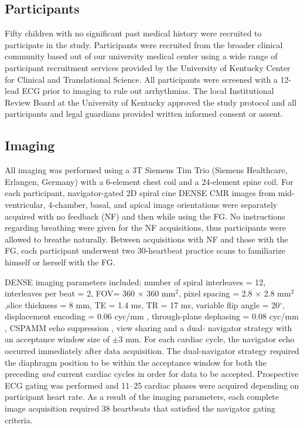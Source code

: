 \subsection{Participants}
	Fifty children with no significant past medical history were recruited to participate in the study. Participants were recruited from the broader clinical community based out of our university medical center using a wide range of participant recruitment services provided by the University of Kentucky Center for Clinical and Translational Science. All participants were screened with a 12-lead ECG prior to imaging to rule out arrhythmias. The local Institutional Review Board at the University of Kentucky approved the study protocol and all participants and legal guardians provided written informed consent or assent.

\subsection{Imaging}
	All imaging was performed using a 3T Siemens Tim Trio (Siemens Healthcare, Erlangen, Germany) with a 6-element chest coil and a 24-element spine coil. For each participant, navigator-gated 2D spiral cine DENSE CMR \cite{Zhong2010a,Wehner2015} images from mid-ventricular, 4-chamber, basal, and apical image orientations were separately acquired with no feedback (NF) and then while using the FG. No instructions regarding breathing were given for the NF acquisitions, thus participants were allowed to breathe naturally. Between acquisitions with NF and those with the FG, each participant underwent two 30-heartbeat practice scans to familiarize himself or herself with the FG.
	
	DENSE imaging parameters included: number of spiral interleaves = 12, interleaves per beat = 2, FOV= 360 × 360 mm$^2$, pixel spacing = 2.8 × 2.8 mm$^2$,slice thickness = 8 mm, TE = 1.4 ms, TR = 17 ms, variable flip angle = 20$^{\circ}$, displacement encoding = 0.06 cyc/mm \cite{Wehner2015a}, through-plane dephasing = 0.08 cyc/mm \cite{Zhong2006a}, CSPAMM echo suppression \cite{Kim2004}, view sharing and a dual- navigator strategy \cite{Hamlet2016a} with an acceptance window size of $\pm$3 mm. For each cardiac cycle, the navigator echo occurred immediately after data acquisition. The dual-navigator strategy required the diaphragm position to be within the acceptance window for both the preceding \textit{and} current cardiac cycles in order for data to be accepted. Prospective ECG gating was performed and 11--25 cardiac phases were acquired depending on participant heart rate. As a result of the imaging parameters, each complete image acquisition required 38 heartbeats that satisfied the navigator gating criteria.
	
